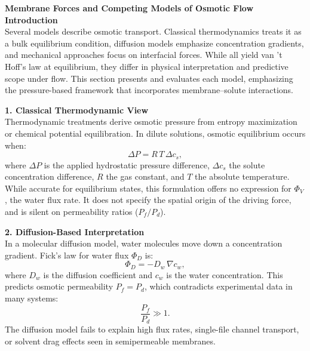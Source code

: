 \begin{technical}
{\Large\textbf{Membrane Forces and Competing Models of Osmotic Flow}}\\[0.7em]

\noindent\textbf{Introduction}\\[0.5em]
Several models describe osmotic transport. Classical thermodynamics treats it as a bulk equilibrium condition, diffusion models emphasize concentration gradients, and mechanical approaches focus on interfacial forces. While all yield van ’t Hoff’s law at equilibrium, they differ in physical interpretation and predictive scope under flow. This section presents and evaluates each model, emphasizing the pressure-based framework that incorporates membrane–solute interactions.

\noindent\textbf{1. Classical Thermodynamic View}\\[0.5em]
Thermodynamic treatments derive osmotic pressure from entropy maximization or chemical potential equilibration. In dilute solutions, osmotic equilibrium occurs when:
\begin{equation}
\Delta P = R\,T\,\Delta c_s,
\end{equation}
where $\Delta P$ is the applied hydrostatic pressure difference, $\Delta c_s$ the solute concentration difference, $R$ the gas constant, and $T$ the absolute temperature. While accurate for equilibrium states, this formulation offers no expression for $\Phi_V$, the water flux rate. It does not specify the spatial origin of the driving force, and is silent on permeability ratios ($P_f / P_d$).

\noindent\textbf{2. Diffusion-Based Interpretation}\\[0.5em]
In a molecular diffusion model, water molecules move down a concentration gradient. Fick’s law for water flux $\Phi_D$ is:
\begin{equation}
\Phi_D = -D_w \,\nabla c_w,
\end{equation}
where $D_w$ is the diffusion coefficient and $c_w$ is the water concentration. This predicts osmotic permeability $P_f = P_d$, which contradicts experimental data in many systems:
\[
\frac{P_f}{P_d} \gg 1.
\]
The diffusion model fails to explain high flux rates, single-file channel transport, or solvent drag effects seen in semipermeable membranes.


\end{technical}
